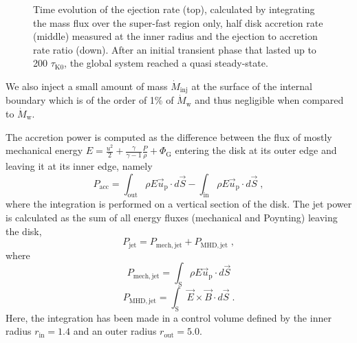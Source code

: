 \documentclass{aa}
\begin{document}
\begin{figure}
   \caption{Time evolution of the ejection rate (top), calculated by integrating the mass flux over the super-fast region only, half disk accretion rate (middle) measured at the inner radius and the
	ejection to accretion rate ratio (down). After an initial transient phase that lasted up to 200 $\tau_\mathrm{K0}$, the global system reached a quasi steady-state.}
              \label{acc_rate}%
    \end{figure}
We also inject a small amount of mass $\dot M_\mathrm{inj}$ at the surface of the internal boundary which is of the order of 1\% of $\dot M_\mathrm{w}$ and thus negligible when compared to $\dot M_\mathrm{w}$.


 The accretion power is computed as the difference between the flux of mostly mechanical energy $E= \frac{u^2}{2} + \frac{\gamma}{\gamma-1}\frac{P}{\rho} + \Phi_\mathrm{G} $ entering the disk at its outer edge
and leaving it at its inner edge, namely
\begin{equation}
P_\mathrm{acc} = \int_\mathrm{out} \rho E \vec{u}_\mathrm{p} \cdot d\vec{S} - \int_\mathrm{in} \rho E \vec{u}_\mathrm{p} \cdot d\vec{S} \; ,
\end{equation}
where the integration is performed on a vertical section of the disk. The jet power is calculated as the sum of all energy fluxes (mechanical and Poynting) leaving the disk,
\begin{equation}
P_\mathrm{jet}=P_\mathrm{mech,jet}+P_\mathrm{MHD,jet} \; ,
\end{equation}
where
\begin{equation}
P_\mathrm{mech,jet}= \int_\mathrm{S} \rho E \vec{u}_\mathrm{p} \cdot d\vec{S} 
\end{equation}
\begin{equation}
P_\mathrm{MHD,jet}= \int_\mathrm{S} \vec{E} \times \vec{B} \cdot d\vec{S} \; .
\end{equation}
Here, the integration has been made in a control volume defined by the inner radius $r_\mathrm{in} = 1.4$ and an outer radius $r_\mathrm{out} =  5.0$.
\end{document}
